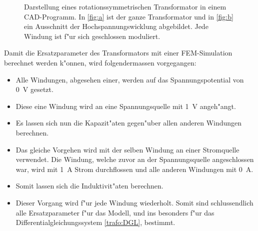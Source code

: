 \begin{refsection}
\begin{figure}
	\centering    
	\caption{Darstellung eines rotationssymmetrischen Transformator in einem CAD-Programm. In \ref{fig:a} ist der ganze Transformator und in \ref{fig:b} ein Ausschnitt der Hochspannungswicklung abgebildet. Jede Windung ist f"ur sich geschlossen moduliert.}
	\label{trafo:infolytica}
\end{figure}

Damit die Ersatzparameter des Transformators mit einer FEM-Simulation berechnet werden k"onnen, wird folgendermassen vorgegangen:
\begin{itemize}
	\item Alle Windungen, abgesehen einer, werden auf das Spannungspotential von  \SI{0}{\volt} gesetzt. 
	\item Diese eine Windung wird an eine Spannungsquelle mit \SI{1}{\volt} angeh"angt.
	\item Es lassen sich nun die Kapazit"aten gegen"uber allen anderen Windungen berechnen.
	\item Das gleiche Vorgehen wird mit der selben Windung an einer Stromquelle verwendet. Die Windung, welche zuvor an der Spannungsquelle angeschlossen war, wird mit \SI{1}{\ampere} Strom durchflossen und alle anderen Windungen mit \SI{0}{\ampere}.
	\item Somit lassen sich die Induktivit"aten berechnen.
	\item Dieser Vorgang wird f"ur jede Windung wiederholt. Somit sind schlussendlich alle Ersatzparameter f"ur das Modell, und ins besonders f"ur das Differentialgleichungssystem \ref{trafo:DGL}, bestimmt.
\end{itemize}



\end{refsection}
